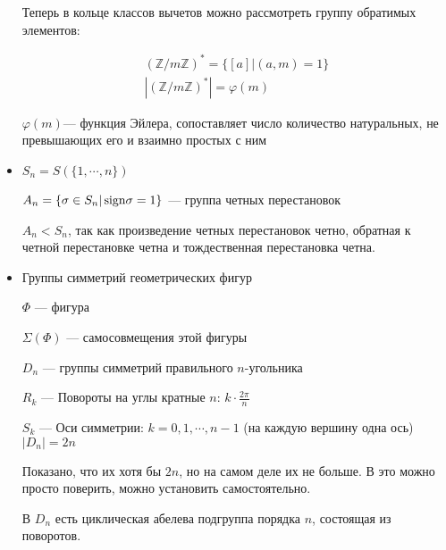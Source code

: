 \begin{itemize}
Теперь в кольце классов вычетов можно рассмотреть группу обратимых элементов: 

\begin{gather*}
  (\mathbb{Z}/m \mathbb{Z})^* = \{ [a] | (a, m) = 1 \} \\
  |(\mathbb{Z}/m \mathbb{Z})^*| = \varphi(m)
\end{gather*}

$\varphi(m)$--- функция Эйлера, сопоставляет число количество натуральных, не превышающих его и взаимно простых с ним

\item 
$S_n = S(\{ 1, \cdots, n \})$

$A_n = \{ \sigma \in S_n | \operatorname{sign \sigma} = 1 \}$ --- группа четных перестановок

$A_n < S_n$, так как произведение четных перестановок четно, обратная к четной перестановке четна и тождественная перестановка четна. 

\item Группы симметрий геометрических фигур

$\Phi$ --- фигура

$\Sigma(\Phi)$ --- самосовмещения этой фигуры

$D_n$ --- группы симметрий правильного $n$-угольника

$R_k$ --- Повороты на углы кратные $n$: $k \cdot \frac{2\pi}{n}$

$S_k$ --- Оси симметрии: $k=0,1,\cdots, n-1$ (на каждую вершину одна ось)
$|D_n| = 2n$

Показано, что их хотя бы $2n$, но на самом деле их не больше. В это можно просто поверить, можно установить самостоятельно.

В $D_n$ есть циклическая абелева подгруппа порядка $n$, состоящая из поворотов.



\end{itemize}
